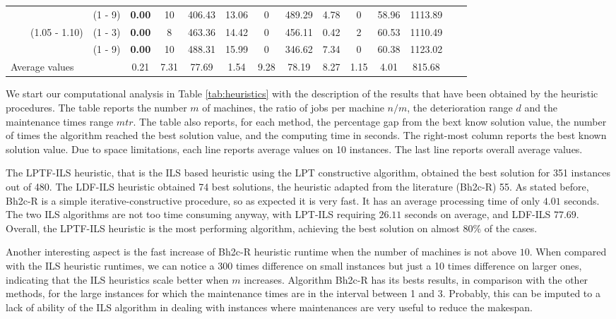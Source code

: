 \documentclass[a4paper,11pt]{article}
\begin{document}
\begin{table}[ht]
\begin{tabular}{cccccccccccccccc}
 &  &  & 				 (1 - 9)  &  \textbf{0.00} &  10 &		406.43     &  13.06  	    &  0	&  489.29      &  4.78 & 0 &  58.96      &  1113.89 \\
 &  &    (1.05 - 1.10) & (1 - 3)  &  \textbf{0.00} &  8 &		463.36     &  14.42  	    &  0	&  456.11      &  0.42 & 2 &  60.53      &  1110.49 \\
 &  &  & 				 (1 - 9)  &  \textbf{0.00} &  10 &		488.31     &  15.99  	    &  0	&  346.62      &  7.34 & 0 &  60.38      &  1123.02 \\
 \cmidrule(lr){1-4} \cmidrule(lr){5-7} \cmidrule(lr){8-10} \cmidrule(lr){11-13} \cmidrule(lr){14-14}
\multicolumn{4}{l}{Average values} & 0.21 & 7.31 & 77.69 & 1.54 & 9.28 & 78.19 & 8.27 & 1.15 & 4.01 &815.68\\




\bottomrule
\end{tabular}
\end{table}

We start our computational analysis in Table \ref{tab:heuristics} with the description of the results that have been obtained by the heuristic procedures. The table reports the 
number $m$ of machines, the ratio of jobs per machine $n/m$, the deterioration range $d$ and the maintenance times range $mtr$. The table also reports, for each method, the percentage gap from the bext know solution value, the number of times the algorithm reached the best solution value, and the computing time in seconds. The right-most column reports the best known solution value. Due to space limitations, each line reports average values on 10 instances. The last line reports overall average values. 

The {LPTF-ILS} heuristic, that is the {ILS} based heuristic using the {LPT} constructive algorithm, obtained the best solution for 351 instances out of 480. The {LDF-ILS} heuristic obtained 74 best solutions, the heuristic adapted from the literature (Bh2c-R) 55. As stated before, {Bh2c-R} is a simple iterative-constructive procedure, so as expected it is very fast. It has an average processing time of only $4.01$ seconds. The two ILS algorithms are not too time consuming anyway, with LPT-ILS requiring $26.11$ seconds on average, and LDF-ILS $77.69$. Overall, the {LPTF-ILS} heuristic is the most performing algorithm, achieving the best solution on almost $80\%$ of the cases.

Another interesting aspect is the fast increase of {Bh2c-R} heuristic runtime when the number of machines is not above $10$. When compared with the ILS heuristic runtimes, we can notice a 300 times difference on small instances but just a 10 times difference on larger ones, indicating that the ILS heuristics scale better when $m$ increases. Algorithm {Bh2c-R} has its bests results, in comparison with the other methods,  for the large instances for which the maintenance times are in the interval between 1 and 3. Probably, this can be imputed to a lack of ability of the ILS algorithm in dealing with instances where maintenances are very useful to reduce the makespan.  
\end{document}

